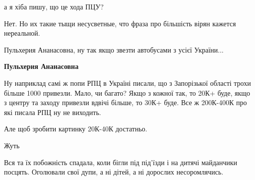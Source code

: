 \begin{itemize}
\begin{itemize}
а я хіба пишу, що це хода ПЦУ?

 
Нет. Но их такие тыщи несусветные, что фраза про більшість вірян кажется нереальной.

 
Пульхерия Ананасовна, ну так якщо звезти автобусами з усієї України...

 
\textbf{Пульхерия Ананасовна} 

Ну наприклад самі ж попи РПЦ в Україні писали, що з Запорізької області трохи
більше 1000 привезли. Мало, чи багато? Якщо з кожної так, то 20К+ буде, якщо з
центру та заходу привезли вдвічі більше, то 30К+ буде. Все ж 200К-400К про які
писала РПЦ ну не виходить.

Але щоб зробити картинку 20К-40К достатньо.

\end{itemize}

 
Жуть

 

Вся та їх побожність спадала, коли бігли під під'їзди і на дитячі майданчики
посцять. Оголювали свої дупи, а ні дітей, а ні дорослих несоромлячись.


\end{itemize}
